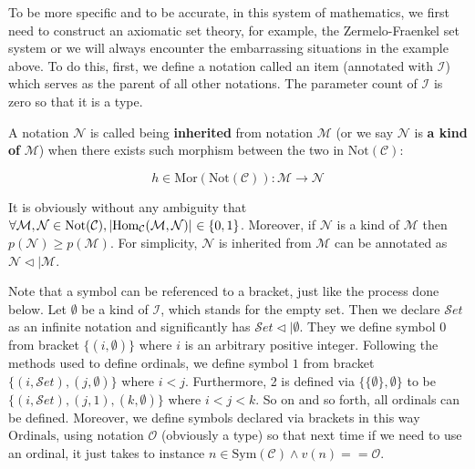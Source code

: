 \documentclass[preprint]{elsarticle}
\numberwithin{theorem}{section}	%
\numberwithin{axiom}{section}	%
\numberwithin{definition}{section}	%
\begin{document}
To be more specific and to be accurate, in this system of mathematics, we first need to construct an axiomatic set theory, for example, the Zermelo-Fraenkel set system or we will always encounter the embarrassing situations in the example above. To do this, first, we define a notation called an item (annotated with \(\mathcal{I}\)) which serves as the parent of all other notations. The parameter count of \(\mathcal{I}\) is zero so that it is a type.

\begin{definition}
	A notation \(\mathcal{N}\) is called being \textbf{ inherited} from notation \(\mathcal{M}\) (or we say \(\mathcal{N}\) is\textbf{  a kind of} \(\mathcal{M}\)) when there exists such morphism between the two in \(\text{Not}(\mathcal{C})\):
	
	\begin{equation}
		h\in \text{Mor}(\text{Not}(\mathcal{C})): \mathcal{M}\to \mathcal{N}
	\end{equation}

	It is obviously without any ambiguity that \(\forall \mathcal{M},\mathcal{N}\in \text{Not}(\mathcal{C}),\left|\text{Hom}_{\mathcal{C}}(\mathcal{M},\mathcal{N})\right|$ $\in \{0,1\}\). Moreover, if \(\mathcal{N}\) is a kind of \(\mathcal{M}\) then \(\mathit{p}(\mathcal{N})\geq \mathit{p}(\mathcal{M})\). For simplicity, \(\mathcal{N}\) is inherited from \(\mathcal{M}\) can be annotated as \(\mathcal{N}\triangleleft |\mathcal{M}\).
\end{definition}

Note that a symbol can be referenced to a bracket, just like the process done below. Let \(\emptyset\) be a kind of \(\mathcal{I}\), which stands for the empty set. Then we declare \(\mathcal{S}\mathit{e}\mathit{t}\) as an infinite notation and significantly has \(\mathcal{S}\mathit{e}\mathit{t}\triangleleft |\emptyset\). They we define symbol \(0\) from bracket \(\{(i,\emptyset )\}\) where \(i\) is an arbitrary positive integer. Following the methods used to define ordinals, we define symbol \(1\) from bracket \(\{(i,\mathcal{S}\mathit{e}\mathit{t}),(j,\emptyset )\}\) where \(i<j\). Furthermore, 2 is defined via \(\{\{\emptyset \},\emptyset \}\) to be \(\{(i,\mathcal{S}\mathit{e}\mathit{t}),(j,1),(k,\emptyset )\}\) where \(i<j<k\). So on and so forth, all ordinals can be defined. Moreover, we define symbols declared via brackets in this way \(\text{Ordinals}\), using notation \(\mathcal{O}\) (obviously a type) so that next time if we need to use an ordinal, it just takes to instance \(n\in \text{Sym}(\mathcal{C})\land \mathit{v}(n)==\mathcal{O}\).
\end{document}
